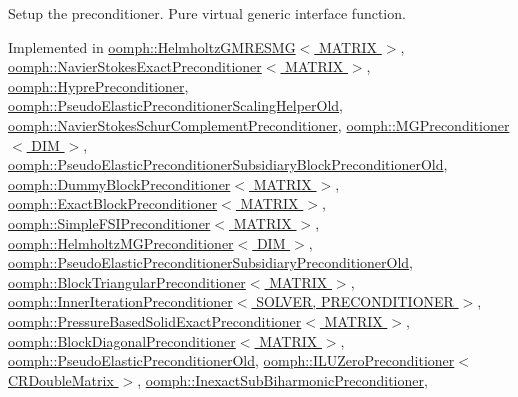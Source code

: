 Setup the preconditioner. Pure virtual generic interface function. 



Implemented in \hyperlink{classoomph_1_1HelmholtzGMRESMG_ae566e34da6aa9ca70a034f7ef93a1aa5}{oomph\+::\+Helmholtz\+G\+M\+R\+E\+S\+M\+G$<$ M\+A\+T\+R\+I\+X $>$}, \hyperlink{classoomph_1_1NavierStokesExactPreconditioner_a2879372ba29ceaf57e68f711cd4113aa}{oomph\+::\+Navier\+Stokes\+Exact\+Preconditioner$<$ M\+A\+T\+R\+I\+X $>$}, \hyperlink{classoomph_1_1HyprePreconditioner_a5622db3b409cbdc49887aa65fa35215a}{oomph\+::\+Hypre\+Preconditioner}, \hyperlink{classoomph_1_1PseudoElasticPreconditionerScalingHelperOld_a42dca15c6f3678880f3b84ccb91513c7}{oomph\+::\+Pseudo\+Elastic\+Preconditioner\+Scaling\+Helper\+Old}, \hyperlink{classoomph_1_1NavierStokesSchurComplementPreconditioner_a03cbfa527081ea03c910aadc281615d7}{oomph\+::\+Navier\+Stokes\+Schur\+Complement\+Preconditioner}, \hyperlink{classoomph_1_1MGPreconditioner_a476a8e769a62e52e1db6c618ede7408d}{oomph\+::\+M\+G\+Preconditioner$<$ D\+I\+M $>$}, \hyperlink{classoomph_1_1PseudoElasticPreconditionerSubsidiaryBlockPreconditionerOld_a4477e968641690ab5c66c8155aef8a99}{oomph\+::\+Pseudo\+Elastic\+Preconditioner\+Subsidiary\+Block\+Preconditioner\+Old}, \hyperlink{classoomph_1_1DummyBlockPreconditioner_a5bca747d99ecd5b18aef416fb6ad2c99}{oomph\+::\+Dummy\+Block\+Preconditioner$<$ M\+A\+T\+R\+I\+X $>$}, \hyperlink{classoomph_1_1ExactBlockPreconditioner_a9961dff2ee506c32c52a04d1c0bd631d}{oomph\+::\+Exact\+Block\+Preconditioner$<$ M\+A\+T\+R\+I\+X $>$}, \hyperlink{classoomph_1_1SimpleFSIPreconditioner_aaf19c0c3f19f6d8ef4f36a1581829230}{oomph\+::\+Simple\+F\+S\+I\+Preconditioner$<$ M\+A\+T\+R\+I\+X $>$}, \hyperlink{classoomph_1_1HelmholtzMGPreconditioner_aba7a7fb0549452ac56c7e97bd5557c3f}{oomph\+::\+Helmholtz\+M\+G\+Preconditioner$<$ D\+I\+M $>$}, \hyperlink{classoomph_1_1PseudoElasticPreconditionerSubsidiaryPreconditionerOld_a532201f17edc43b3b475fff2d2744b8b}{oomph\+::\+Pseudo\+Elastic\+Preconditioner\+Subsidiary\+Preconditioner\+Old}, \hyperlink{classoomph_1_1BlockTriangularPreconditioner_a2d08f17f9ba08a5772cb32fabcd4f984}{oomph\+::\+Block\+Triangular\+Preconditioner$<$ M\+A\+T\+R\+I\+X $>$}, \hyperlink{classoomph_1_1InnerIterationPreconditioner_a0c20b28ab82a5d7f277c9afef8e99287}{oomph\+::\+Inner\+Iteration\+Preconditioner$<$ S\+O\+L\+V\+E\+R, P\+R\+E\+C\+O\+N\+D\+I\+T\+I\+O\+N\+E\+R $>$}, \hyperlink{classoomph_1_1PressureBasedSolidExactPreconditioner_ab9bdbcabd0ba8e9debfbec6679e66b08}{oomph\+::\+Pressure\+Based\+Solid\+Exact\+Preconditioner$<$ M\+A\+T\+R\+I\+X $>$}, \hyperlink{classoomph_1_1BlockDiagonalPreconditioner_a91bdd8e152045157f77c9cba513fe901}{oomph\+::\+Block\+Diagonal\+Preconditioner$<$ M\+A\+T\+R\+I\+X $>$}, \hyperlink{classoomph_1_1PseudoElasticPreconditionerOld_a25d542a5b98d70be1aa1dd6000402978}{oomph\+::\+Pseudo\+Elastic\+Preconditioner\+Old}, \hyperlink{classoomph_1_1ILUZeroPreconditioner_3_01CRDoubleMatrix_01_4_a2398a8674540bfdb8d69a699085107d8}{oomph\+::\+I\+L\+U\+Zero\+Preconditioner$<$ C\+R\+Double\+Matrix $>$}, \hyperlink{classoomph_1_1InexactSubBiharmonicPreconditioner_aedc32eecdba45ee74777d340665ebdee}{oomph\+::\+Inexact\+Sub\+Biharmonic\+Preconditioner}, 